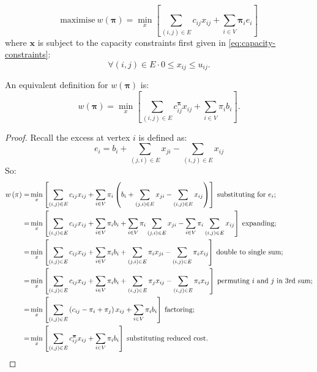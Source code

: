 \begin{equation} \label{eq:relax-obj-fun-excess}
\mathrm{maximise}\: w\left(\boldsymbol{\pi}\right)=\min_{x}\left[\sum_{\left(i,j\right)\in E}c_{ij}x_{ij}+\sum_{i\in V}\boldsymbol{\pi}_{i}e_{i}\right]
\end{equation}
where $\mathbf{x}$ is subject to the capacity constraints first given in \cref{eq:capacity-constraints}:
\[\forall\left(i,j\right)\in E\cdot 0\leq x_{ij}\leq u_{ij}.\]

\begin{lemma}
An equivalent definition for $w(\boldsymbol{\pi})$ is:
\begin{equation} \label{eq:relax-obj-fun-balance}
w(\boldsymbol{\pi})=\min_{x}\left[\sum_{\left(i,j\right)\in E}c_{ij}^{\boldsymbol{\pi}}x_{ij}+\sum_{i\in V}\pi_{i}b_{i}\right].
\end{equation}
\end{lemma}
\begin{proof}
Recall the excess at vertex $i$ is defined as:
\[e_{i}=b_{i}+\sum_{(j,i)\in E}x_{ji}-\sum_{(i,j)\in E}x_{ij}\]
So:
\begin{align*}
w\left(\pi\right)= & \min_{x}\left[\sum_{\left(i,j\right)\in E}c_{ij}x_{ij}+\sum_{i\in V}\pi_{i}\left(b_{i}+\sum_{(j,i)\in E}x_{ji}-\sum_{(i,j)\in E}x_{ij}\right)\right]\:\mbox{substituting for }e_{i};\\
= & \min_{x}\left[\sum_{\left(i,j\right)\in E}c_{ij}x_{ij}+\sum_{i\in V}\pi_{i}b_{i}+\sum_{i\in V}\pi_{i}\sum_{(j,i)\in E}x_{ji}-\sum_{i\in V}\pi_{i}\sum_{(i,j)\in E}x_{ij}\right]\:\mbox{expanding;}\\
= & \min_{x}\left[\sum_{\left(i,j\right)\in E}c_{ij}x_{ij}+\sum_{i\in V}\pi_{i}b_{i}+\sum_{(j,i)\in E}\pi_{i}x_{ji}-\sum_{(i,j)\in E}\pi_{i}x_{ij}\right]\:\mbox{double to single sum;}\\
= & \min_{x}\left[\sum_{\left(i,j\right)\in E}c_{ij}x_{ij}+\sum_{i\in V}\pi_{i}b_{i}+\sum_{(i,j)\in E}\pi_{j}x_{ij}-\sum_{(i,j)\in E}\pi_{i}x_{ij}\right]\:\mbox{permuting \ensuremath{i} and \ensuremath{j} in 3rd sum;}\\
= & \min_{x}\left[\sum_{\left(i,j\right)\in E}\left(c_{ij}-\pi_{i}+\pi_{j}\right)x_{ij}+\sum_{i\in V}\pi_{i}b_{i}\right]\:\mbox{factoring;}\\
= & \min_{x}\left[\sum_{\left(i,j\right)\in E}c_{ij}^{\boldsymbol{\pi}}x_{ij}+\sum_{i\in V}\pi_{i}b_{i}\right]\:\mbox{substituting reduced cost.}
\end{align*}
\end{proof}

